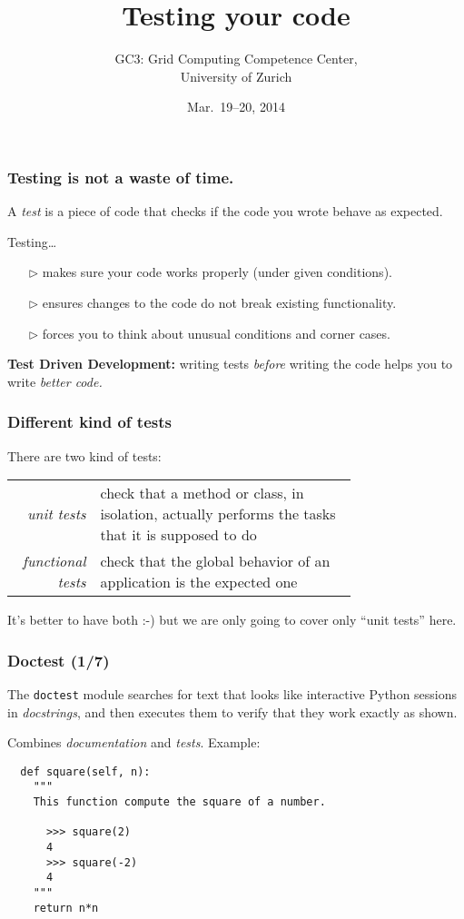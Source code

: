 \documentclass[english,serif,mathserif,xcolor=pdftex,dvipsnames,table]{beamer}
\title[Testing]{%
  Testing your code
}
\author[GC3]{%
  GC3: Grid Computing Competence Center, \\
  University of Zurich
}
\date{Mar.~19--20, 2014}
\begin{document}
\maketitle


\begin{frame}
  \frametitle{Testing is \textbf{not} a waste of time.}
  A \emph{test} is a piece of code that checks if the code you
  wrote behave as expected.

  \+
  Testing\ldots
  \begin{itemize}
  \item[$\triangleright$] makes sure your code works properly (under given conditions).
  \item[$\triangleright$] ensures changes to the code do not break existing functionality.
  \item[$\triangleright$] forces you to think about unusual conditions and corner cases.
  \end{itemize}

  \+ \textbf{Test Driven Development:} writing tests \textit{before}
  writing the code helps you to write \emph{better code.}
\end{frame}


\begin{frame}
  \frametitle{Different kind of tests}

  There are two kind of tests:

  \+
  \begin{tabular}{>{\em}r>{\raggedright}p{0.75\linewidth}}
    unit tests
    &
    check that a method or class, in isolation,
    actually performs the tasks that it is supposed to do
    \\
    functional tests
    &
    check that the global behavior of an application is the expected one
    \\
  \end{tabular}

  \+
  It's better to have both :-) but we are only going to cover
  only ``unit tests'' here.
\end{frame}


\begin{frame}[fragile]
  \frametitle{Doctest (1/7)}

  The \lstinline|doctest| module searches for text that looks like
  interactive Python sessions in \textit{docstrings}, and then
  executes them to verify that they work exactly as shown.

  \+
  Combines \textit{documentation} and \textit{tests}. Example:
  \begin{lstlisting}
  def square(self, n):
    """
    This function compute the square of a number.

      >>> square(2)
      4
      >>> square(-2)
      4
    """
    return n*n
  \end{lstlisting}
\end{frame}
\end{document}
